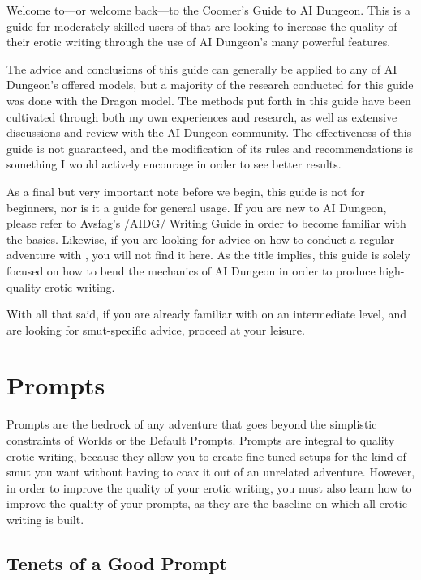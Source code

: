 ﻿\documentclass[Coomer-main.tex]{subfiles}
\begin{document}
\label{ch:preface}

Welcome to—or welcome back—to the Coomer's Guide to AI Dungeon. This is a guide for moderately skilled users of \aid that are looking to increase the quality of their erotic writing through the use of AI Dungeon's many powerful features.

The advice and conclusions of this guide can generally be applied to any of AI Dungeon's offered models, but a majority of the research conducted for this guide was done with the Dragon model. The methods put forth in this guide have been cultivated through both my own experiences and research, as well as extensive discussions and review with the AI Dungeon community. The effectiveness of this guide is not guaranteed, and the modification of its rules and recommendations is something I would actively encourage in order to see better results.

As a final but very important note before we begin, this guide is not for beginners, nor is it a guide for general usage. If you are new to AI Dungeon, please refer to Avsfag's /AIDG/ Writing Guide in order to become familiar with the basics. Likewise, if you are looking for advice on how to conduct a regular adventure with \aid, you will not find it here. As the title implies, this guide is solely focused on how to bend the mechanics of AI Dungeon in order to produce high-quality erotic writing.

With all that said, if you are already familiar with \aid on an intermediate level, and are looking for smut-specific advice, proceed at your leisure.

\chapter{Prompts}
\label{ch:prompts}

Prompts are the bedrock of any \aid adventure that goes beyond the simplistic constraints of Worlds or the Default Prompts. Prompts are integral to quality erotic writing, because they allow you to create fine-tuned setups for the kind of smut you want without having to coax it out of an unrelated adventure. However, in order to improve the quality of your erotic writing, you must also learn how to improve the quality of your prompts, as they are the baseline on which all erotic writing is built.

\section{Tenets of a Good Prompt}
\label{sec:tenets}
\end{document}
